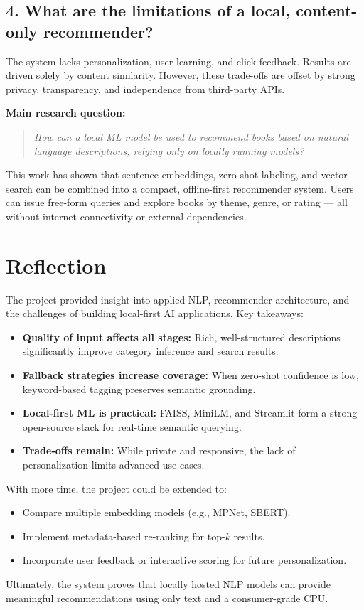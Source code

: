 \subsection*{4. What are the limitations of a local, content-only recommender?}
The system lacks personalization, user learning, and click feedback. Results are driven solely by content similarity. However, these trade-offs are offset by strong privacy, transparency, and independence from third-party APIs.

\textbf{Main research question:}

\begin{quote}
\textit{How can a local ML model be used to recommend books based on natural language descriptions, relying only on locally running models?}
\end{quote}

This work has shown that sentence embeddings, zero-shot labeling, and vector search can be combined into a compact, offline-first recommender system. Users can issue free-form queries and explore books by theme, genre, or rating — all without internet connectivity or external dependencies.

\section{Reflection}
\label{sec:reflection}

The project provided insight into applied NLP, recommender architecture, and the challenges of building local-first AI applications. Key takeaways:

\begin{itemize}
    \item \textbf{Quality of input affects all stages:} Rich, well-structured descriptions significantly improve category inference and search results.
    \item \textbf{Fallback strategies increase coverage:} When zero-shot confidence is low, keyword-based tagging preserves semantic grounding.
    \item \textbf{Local-first ML is practical:} FAISS, MiniLM, and Streamlit form a strong open-source stack for real-time semantic querying.
    \item \textbf{Trade-offs remain:} While private and responsive, the lack of personalization limits advanced use cases.
\end{itemize}

With more time, the project could be extended to:

\begin{itemize}
    \item Compare multiple embedding models (e.g., MPNet, SBERT).
    \item Implement metadata-based re-ranking for top-$k$ results.
    \item Incorporate user feedback or interactive scoring for future personalization.
\end{itemize}

Ultimately, the system proves that locally hosted NLP models can provide meaningful recommendations using only text and a consumer-grade CPU.
